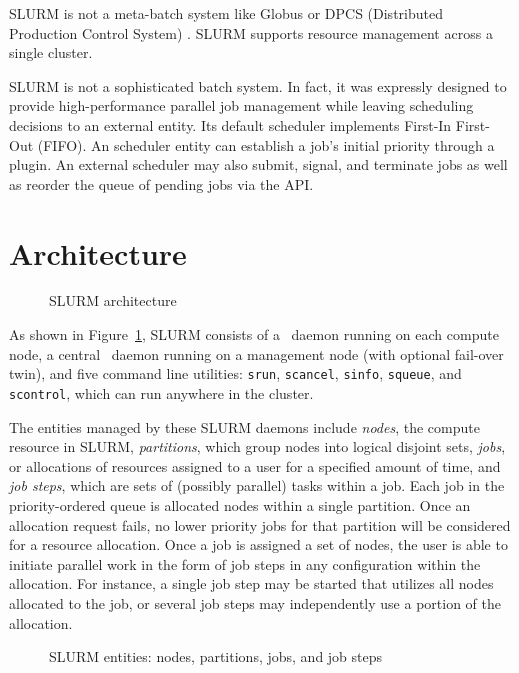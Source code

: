 \documentclass[10pt,onecolumn,times]{llncs}
\begin{document}
{SLURM is not a meta-batch system like Globus \cite{Globus2002} or DPCS
(Distributed Production Control System) \cite{DPCS2002}.  SLURM supports
resource management across a single cluster.

SLURM is not a sophisticated batch system.  In fact, it was expressly
designed to provide high-performance parallel job management while
leaving scheduling decisions to an external entity.  Its default scheduler
implements First-In First-Out (FIFO).  An scheduler entity can establish
a job's initial priority through a plugin.  An external scheduler may
also submit, signal, and terminate jobs as well as reorder the queue of
pending jobs via the API.


\section{Architecture}

\begin{figure}[tb]
\centerline{}
\caption{\small SLURM architecture}
\label{arch}
\end{figure}

As shown in Figure~\ref{arch}, SLURM consists of a \slurmd\ daemon
running on each compute node, a central \slurmctld\ daemon running
on a management node (with optional fail-over twin), and five command
line utilities: {\tt srun}, {\tt scancel}, {\tt sinfo}, {\tt squeue},
and {\tt scontrol}, which can run anywhere in the cluster.

The entities managed by these SLURM daemons include {\em nodes}, the
compute resource in SLURM, {\em partitions}, which group nodes into
logical disjoint sets, {\em jobs}, or allocations of resources assigned
to a user for a specified amount of time, and {\em job steps}, which
are sets of (possibly parallel) tasks within a job.  Each job in the
priority-ordered queue is allocated nodes within a single partition.
Once an allocation request fails, no lower priority jobs for that
partition will be considered for a resource allocation.  Once a job is
assigned a set of nodes, the user is able to initiate parallel work in
the form of job steps in any configuration within the allocation. For
instance, a single job step may be started that utilizes all nodes
allocated to the job, or several job steps may independently use a
portion of the allocation.

\begin{figure}[tcb]
\centerline{}
\caption{\small SLURM entities: nodes, partitions, jobs, and job steps}
\label{entities}
\end{figure}

}
\end{document}
